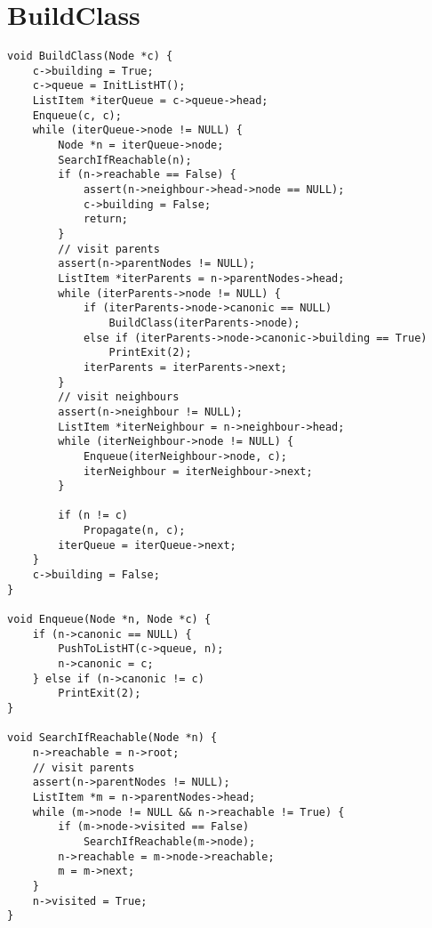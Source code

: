 \documentclass[12pt,a4paper,openright,twoside]{report}
\begin{document}
\section{BuildClass}
\begin{verbatim}
void BuildClass(Node *c) {
    c->building = True;
    c->queue = InitListHT();
    ListItem *iterQueue = c->queue->head;
    Enqueue(c, c);
    while (iterQueue->node != NULL) {
        Node *n = iterQueue->node;
        SearchIfReachable(n);
        if (n->reachable == False) {
            assert(n->neighbour->head->node == NULL);
            c->building = False;
            return;
        }
        // visit parents
        assert(n->parentNodes != NULL);
        ListItem *iterParents = n->parentNodes->head;
        while (iterParents->node != NULL) {
            if (iterParents->node->canonic == NULL)
                BuildClass(iterParents->node);
            else if (iterParents->node->canonic->building == True)
                PrintExit(2);
            iterParents = iterParents->next;
        }
        // visit neighbours
        assert(n->neighbour != NULL);
        ListItem *iterNeighbour = n->neighbour->head;
        while (iterNeighbour->node != NULL) {
            Enqueue(iterNeighbour->node, c);
            iterNeighbour = iterNeighbour->next;
        }

        if (n != c)
            Propagate(n, c);
        iterQueue = iterQueue->next;
    }
    c->building = False;
}

void Enqueue(Node *n, Node *c) {
    if (n->canonic == NULL) {
        PushToListHT(c->queue, n);
        n->canonic = c;
    } else if (n->canonic != c)
        PrintExit(2);
}

void SearchIfReachable(Node *n) {
    n->reachable = n->root;
    // visit parents
    assert(n->parentNodes != NULL);
    ListItem *m = n->parentNodes->head;
    while (m->node != NULL && n->reachable != True) {
        if (m->node->visited == False)
            SearchIfReachable(m->node);
        n->reachable = m->node->reachable;
        m = m->next;
    }
    n->visited = True;
}
\end{verbatim}
\end{document}
